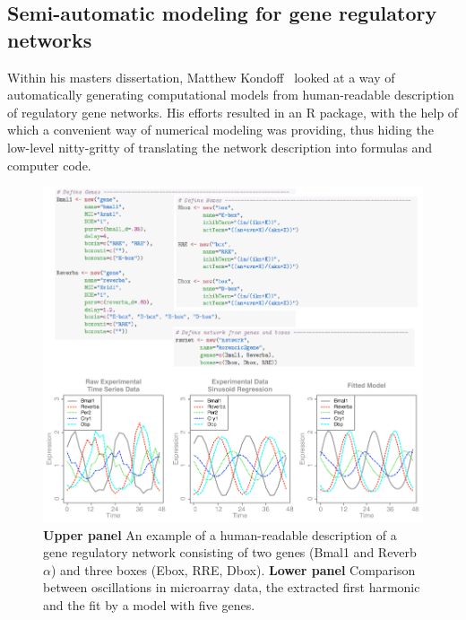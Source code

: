 \subsection{Semi-automatic modeling for gene regulatory networks}
Within his masters dissertation, Matthew
Kondoff~\cite{kondoff2015modeling} looked at a way of automatically
generating computational models from human-readable description of
regulatory gene networks. His efforts resulted in an R package, with
the help of which a convenient way of numerical modeling was
providing, thus hiding the low-level nitty-gritty of translating the
network description into formulas and computer code.

\begin{figure}
\begin{center}
\includegraphics[width=\linewidth]{figures/matt/matt.pdf}
\end{center}
\caption{
  {\bf Upper panel} An example of a human-readable description of a
  gene regulatory network consisting of two genes (Bmal1 and
  Reverb$\alpha$) and three boxes (Ebox, RRE, Dbox).
  {\bf Lower panel} Comparison between oscillations in microarray
  data, the extracted first harmonic and the fit by a model with five
  genes.
\label{fig::matt}
}
\end{figure}

